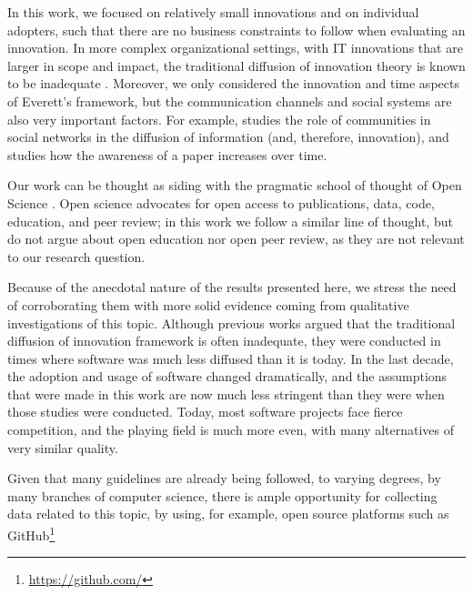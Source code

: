 \documentclass[12pt]{article}
\begin{document}
In this work, we focused on relatively small innovations and on individual adopters, such that there are no business constraints to follow when evaluating an innovation. In more complex organizational settings, with IT innovations that are larger in scope and impact, the traditional diffusion of innovation theory is known to be inadequate \citep{whatswrongwithdoi}. Moreover, we only considered the innovation and time aspects of Everett's framework, but the communication channels and social systems are also very important factors. For example, \cite{communities} studies the role of communities in social networks in the diffusion of information (and, therefore, innovation), and \cite{paperawareness} studies how the awareness of a paper increases over time.

Our work can be thought as siding with the pragmatic school of thought of Open Science \citep{fiveopenscience}. Open science advocates for open access to publications, data, code, education, and peer review; in this work we follow a similar line of thought, but do not argue about open education nor open peer review, as they are not relevant to our research question.

Because of the anecdotal nature of the results presented here, we stress the need of corroborating them with more solid evidence coming from qualitative investigations of this topic. Although previous works argued that the traditional diffusion of innovation framework is often inadequate, they were conducted in times where software was much less diffused than it is today. In the last decade, the adoption and usage of software changed dramatically, and the assumptions that were made in this work are now much less stringent than they were when those studies were conducted. Today, most software projects face fierce competition, and the playing field is much more even, with many alternatives of very similar quality.

Given that many guidelines are already being followed, to varying degrees, by many branches of computer science, there is ample opportunity for collecting data related to this topic, by using, for example, open source platforms such as GitHub\footnote{\url{https://github.com/}}




\end{document}

